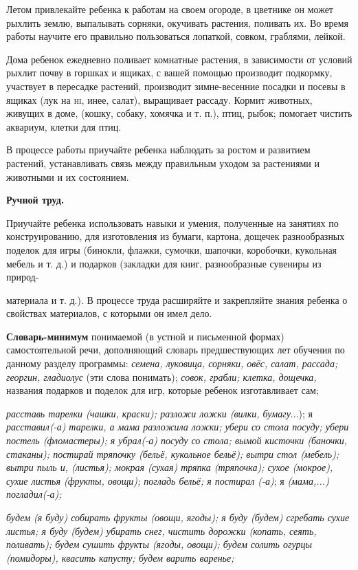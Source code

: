 \documentclass[a5paper]{book}
\renewcommand{\emph}[1]{\textit{#1}}
\begin{document}
Летом привлекайте ребенка к работам на своем огороде, в цветнике он
может рыхлить землю, выпалывать сорняки, окучивать растения, поливать
их. Во время работы научите его правильно пользоваться лопаткой, совком,
граблями, лейкой.

Дома ребенок ежедневно поливает комнатные растения, в зависимости от
условий рыхлит почву в горшках и ящиках, с вашей помощью производит
подкормку, участвует в пересадке растений, производит зимне-весенние
посадки и посевы в ящиках (лук на \textsc{hi,} инее, салат), выращивает
рассаду. Кормит животных, живущих в доме, (кошку, собаку, хомячка и т.
п.), птиц, рыбок; помогает чистить аквариум, клетки для птиц.

В процессе работы приучайте ребенка наблюдать за ростом и развитием
растений, устанавливать связь между правильным уходом за растениями и
животными и их состоянием.

\textbf{Ручной труд.}

Приучайте ребенка использовать навыки и умения, полученные на занятиях
по конструированию, для изготовления из бумаги, картона, дощечек
разнообразных поделок для игры (бинокли, флажки, сумочки, шапочки,
коробочки, кукольная мебель и т. д.) и подарков (закладки для книг,
разнообразные сувениры из природ-

материала и т. д.). В процессе труда расширяйте и закрепляйте знания
ребенка о свойствах материалов, с которыми он имел дело.

\textbf{Словарь-минимум} понимаемой (в устной и письменной формах)
самостоятельной речи, дополняющий словарь предшествующих лет обучения по
данному разделу программы: \emph{семена, луковица, сорняки, овёс, салат,
рассада; георгин, гладиолус} (эти слова понимать); \emph{совок, грабли;
клетка, дощечка,} названия подарков и поделок для игр, которые ребенок
изготавливает сам;

\emph{расставь тарелки (чашки, краски); разложи ложки (вилки,
бумагу}...); я \emph{расставил(-а) тарелки, а мама разложила ложки;
убери со стола посуду; убери постель (фломастеры); я убрал(-а) посуду со
стола; вымой кисточки (баночки, стаканы); постирай тряпочку (бельё,
кукольное бельё); вытри стол (мебель); вытри пыль и, (листья); мокрая
(сухая) тряпка (тряпочка); сухое (мокрое), сухие листья (фрукты, овощи);
погладь бельё; я постирал (-а)}; я \emph{(мама,...) погладил(-а);}

\emph{будем (я буду) собирать фрукты (овощи, ягоды); я буду (будем)
сгребать сухие листья; я буду (будем) убирать снег, чистить дорожки
(копать, сеять, поливать); будем сушить фрук}т\emph{ы (ягоды, овощи);
будем солить огурцы (помидоры), квасить капусту; будем варить варенье;}
\end{document}
